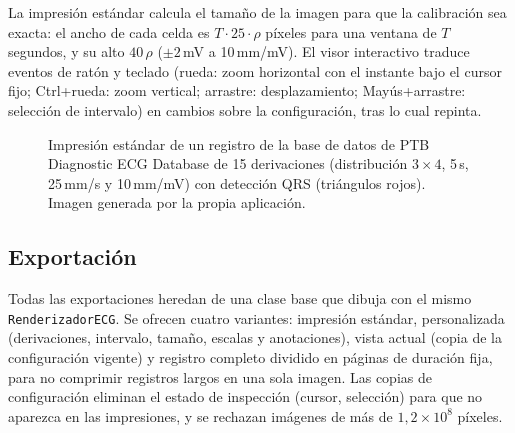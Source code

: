 La impresión estándar calcula el tamaño de la imagen para que la calibración sea exacta: el ancho de cada celda es $T\cdot 25\cdot\rho$ píxeles para una ventana de $T$ segundos, y su alto $40\,\rho$ ($\pm2$\,mV a 10\,mm/mV). El visor interactivo traduce eventos de ratón y teclado (rueda: zoom horizontal con el instante bajo el cursor fijo; Ctrl+rueda: zoom vertical; arrastre: desplazamiento; Mayús+arrastre: selección de intervalo) en cambios sobre la configuración, tras lo cual repinta.

\begin{figure}[t]
\centering
\caption{Impresión estándar de un registro de la base de datos de PTB Diagnostic ECG Database de 15 derivaciones (distribución $3\times4$, 5\,s, 25\,mm/s y 10\,mm/mV) con detección QRS (triángulos rojos). Imagen generada por la propia aplicación.}
\label{fig:estandar}
\end{figure}

\subsection{Exportación}
Todas las exportaciones heredan de una clase base que dibuja con el mismo \texttt{RenderizadorECG}. Se ofrecen cuatro variantes: impresión estándar, personalizada (derivaciones, intervalo, tamaño, escalas y anotaciones), vista actual (copia de la configuración vigente) y registro completo dividido en páginas de duración fija, para no comprimir registros largos en una sola imagen. Las copias de configuración eliminan el estado de inspección (cursor, selección) para que no aparezca en las impresiones, y se rechazan imágenes de más de $1{,}2\times10^{8}$ píxeles.

